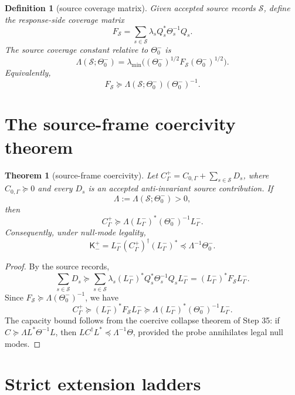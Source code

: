 \documentclass[11pt]{article}
\newtheorem{theorem}{Theorem}
\newtheorem{definition}{Definition}
\begin{document}
\begin{definition}[source coverage matrix]
Given accepted source records \(\mathcal S\), define the response-side coverage matrix
\[
  F_{\mathcal S}
  =
  \sum_{s\in\mathcal S}\lambda_s Q_s^*\Theta_s^{-1}Q_s.
\]
The source coverage constant relative to \(\Theta_0^-\) is
\[
  \Lambda(\mathcal S;\Theta_0^-)
  =
  \lambda_{\min}\!\bigl((\Theta_0^-)^{1/2}F_{\mathcal S}(\Theta_0^-)^{1/2}\bigr).
\]
Equivalently,
\[
  F_{\mathcal S}\succeq \Lambda(\mathcal S;\Theta_0^-)(\Theta_0^-)^{-1}.
\]
\end{definition}

\section{The source-frame coercivity theorem}

\begin{theorem}[source-frame coercivity]
Let \(C_\Gamma^+=C_{0,\Gamma}+\sum_{s\in\mathcal S}D_s\), where \(C_{0,\Gamma}\succeq0\) and every \(D_s\) is an accepted anti-invariant source contribution.  If
\[
  \Lambda:=\Lambda(\mathcal S;\Theta_0^-)>0,
\]
then
\[
  C_\Gamma^+
  \succeq
  \Lambda (L^-_\Gamma)^*(\Theta_0^-)^{-1}L^-_\Gamma.
\]
Consequently, under null-mode legality,
\[
  \mathsf K^+_-
  =L^-_\Gamma(C_\Gamma^+)^\dagger (L^-_\Gamma)^*
  \preceq
  \Lambda^{-1}\Theta_0^-.
\]
\end{theorem}

\begin{proof}
By the source records,
\[
  \sum_{s\in\mathcal S}D_s
  \succeq
  \sum_{s\in\mathcal S}\lambda_s(L^-_\Gamma)^*Q_s^*\Theta_s^{-1}Q_sL^-_\Gamma
  =
  (L^-_\Gamma)^*F_{\mathcal S}L^-_\Gamma.
\]
Since \(F_{\mathcal S}\succeq\Lambda(\Theta_0^-)^{-1}\), we have
\[
  C_\Gamma^+
  \succeq
  (L^-_\Gamma)^*F_{\mathcal S}L^-_\Gamma
  \succeq
  \Lambda (L^-_\Gamma)^*(\Theta_0^-)^{-1}L^-_\Gamma.
\]
The capacity bound follows from the coercive collapse theorem of Step 35: if \(C\succeq \Lambda L^*\Theta^{-1}L\), then \(LC^\dagger L^*\preceq\Lambda^{-1}\Theta\), provided the probe annihilates legal null modes.
\end{proof}

\section{Strict extension ladders}
\end{document}
